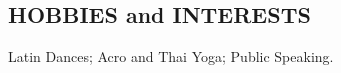 \documentclass[11pt]{res} %
\begin{document}
\begin{resume}
\vspace{-0.1in}
\section{HOBBIES and INTERESTS}
\vspace{0.1in}
Latin Dances; Acro and Thai Yoga; Public Speaking. \\

\end{resume}
\end{document}
